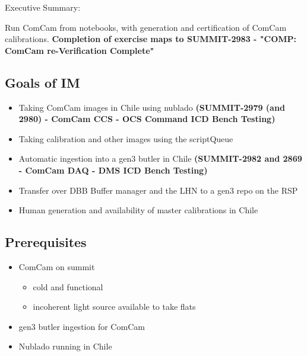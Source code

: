 
Executive Summary:

Run ComCam from notebooks, with generation and certification of ComCam calibrations.
\textbf{Completion of exercise maps to SUMMIT-2983 - "COMP: ComCam re-Verification Complete"}

\subsection{Goals of IM}

\begin{itemize}
	\item Taking ComCam images in Chile using nublado \textbf{(SUMMIT-2979 (and 2980) - ComCam CCS - OCS Command ICD Bench Testing)}
	\item Taking calibration and other images using the \gls{scriptQueue}
	\item Automatic ingestion into a gen3 butler in Chile \textbf{(SUMMIT-2982 and 2869 - ComCam DAQ - DMS ICD Bench Testing)}
	\item Transfer over \gls{DBB Buffer manager} and the \gls{LHN} to a gen3 repo on the \gls{RSP}
	\item Human generation and availability of master calibrations in Chile
\end{itemize}

\subsection{Prerequisites}
\begin{itemize}
	\item{ComCam on summit}
	\begin{itemize}
		\item cold and functional
		\item incoherent light source available to take flats
	\end{itemize}
	\item{gen3 butler ingestion for ComCam}
\item{Nublado running in Chile}
\end{itemize}

